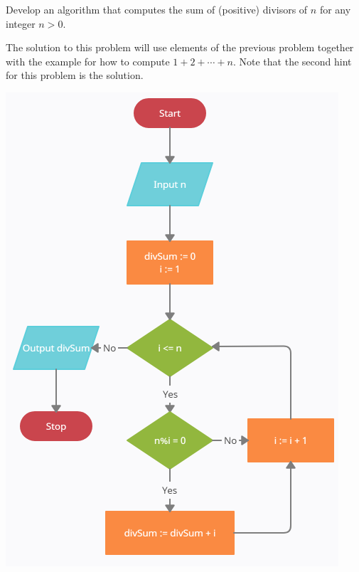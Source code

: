 \documentclass{ximera}
\begin{document}
\begin{question}
	Develop an algorithm that computes the sum of (positive) divisors of $n$ for any integer $n>0$.
	\begin{hint}
		The solution to this problem will use elements of the previous problem together with the example for how to compute $1+2+\cdots+n$. Note that the second hint for this problem is the solution.
	\end{hint}
	\begin{hint}
		\begin{center}
			\includegraphics{divsum.png}
		\end{center}
	\end{hint}
\end{question}
\end{document}

